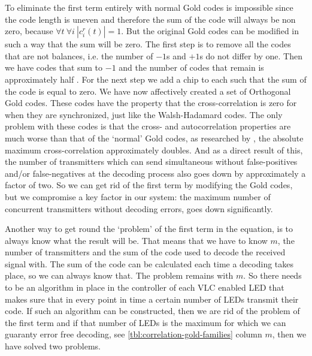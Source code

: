 		To eliminate the first term entirely with normal Gold codes is impossible since the code length is uneven and therefore the sum of the code will always be non zero, because $\forall t \ \forall i \  | c^r_i(t) | = 1$.
		But the original Gold codes can be modified in such a way that the sum will be zero. 
		The first step is to remove all the codes that are not balances, i.e. the number of $-1$s and $+1$s do not differ by one.
		Then we have codes that sum to $-1$ and the number of codes that remain is approximately half \cite{holmes2007spread}.
		For the next step we add a chip to each such that the sum of the code is equal to zero.
		We have now affectively created a set of Orthogonal Gold codes.
		These codes have the property that the cross-correlation is zero for when they are synchronized, just like the Walsh-Hadamard codes.
		The only problem with these codes is that the cross- and autocorrelation properties are much worse than that of the `normal' Gold codes, as researched by \cite{5422934}, the absolute maximum cross-correlation approximately doubles.
		And as a direct result of this, the number of transmitters which can send simultaneous without false-positives and/or false-negatives at the decoding process also goes down by approximately a factor of two.
		So we can get rid of the first term by modifying the Gold codes, but we compromise a key factor in our system: the maximum number of concurrent transmitters without decoding errors, goes down significantly.

		Another way to get round the `problem' of the first term in the equation, is to always know what the result will be.
		That means that we have to know $m$, the number of transmitters and the sum of the code used to decode the received signal with.
		The sum of the code can be calculated each time a decoding takes place, so we can always know that.
		The problem remains with $m$. 
		So there needs to be an algorithm in place in the controller of each VLC enabled LED that makes sure that in every point in time a certain number of LEDs transmit their code.
		If such an algorithm can be constructed, then we are rid of the problem of the first term and if that number of LEDs is the maximum for which we can guaranty error free decoding, see \autoref{tbl:correlation-gold-families} column $m$, then we have solved two problems.



